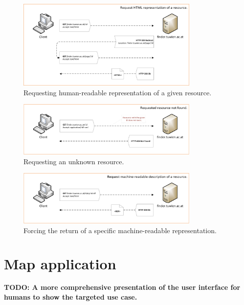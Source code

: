 \documentclass[draft,final]{vutinfth} %
\newcommand{\todo}[1]{{\color{red}\textbf{TODO: {#1}}}} %
\begin{document}
\begin{figure}[h]
    \centering
    \includegraphics[width=0.8\textwidth]{graphics/solution/uri-strategy/uriStrategyHumanReadable.png}
    \caption{Requesting human-readable representation of a given resource.}
    \label{fig:solution-architectural-prototype:ld-publishing:human-readable}
\end{figure}

\begin{figure}[h]
    \centering
    \includegraphics[width=0.8\textwidth]{graphics/solution/uri-strategy/uriStrategyErrorHandling.png}
    \caption{Requesting an unknown resource.}
    \label{fig:solution-architectural-prototype:ld-publishing:human-readable}
\end{figure}

\begin{figure}[h]
    \centering
    \includegraphics[width=0.8\textwidth]{graphics/solution/uri-strategy/uriStrategyForceMachineReadable.png}
    \caption{Forcing the return of a specific machine-readable representation.}
    \label{fig:solution-architectural-prototype:ld-publishing:force-machine-readable}
\end{figure}

\section{Map application}
\label{solution-map-application}
\todo{A more comprehensive presentation of the user interface for humans to show the targeted use case.}
\end{document}
